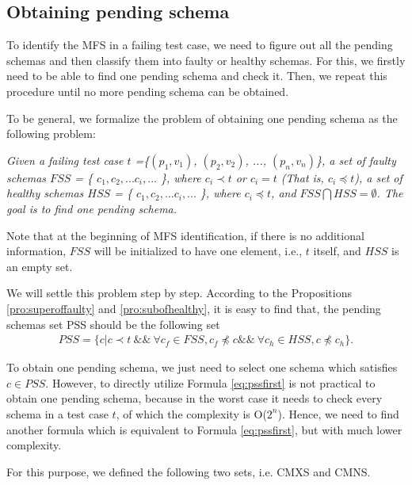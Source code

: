 \subsection{Obtaining pending schema}

To identify the MFS in a failing test case, we need to figure out all the pending schemas and then classify them into faulty or healthy schemas. For this, we firstly need to be able to find one pending schema and check it. Then, we repeat this procedure until no more pending schema can be obtained.

To be general, we formalize the problem of obtaining one pending schema as the following problem:

\emph{Given a failing test case $t$ =\{$(p_{1}, v_{1})$, $(p_{2}, v_{2})$, ..., $(p_{n}, v_{n})$\}, a set of faulty schemas $FSS$ = \{ $c_{1}, c_{2}, ... c_{i}, ...$ \}, where  $c_{i} \prec t$ or $c_{i} = t$ (That is, $c_{i} \preceq t $), a set of healthy schemas $HSS$ = \{ $c_{1}, c_{2}, ... c_{i}, ...$ \}, where  $c_{i} \preceq t$, and $FSS \bigcap HSS = \emptyset$. The goal is to find one pending schema.}

Note that at the beginning of MFS identification, if there is no additional information, $FSS$ will be initialized to have one element, i.e., $t$ itself, and $HSS$ is an empty set.

We will settle this problem step by step. According to the Propositions \ref{pro:superoffaulty} and \ref{pro:subofhealthy}, it is easy to find that, the pending schemas set PSS should be the following set
\begin{equation}
\begin{aligned}\label{eq:pssfirst}
PSS=\{ c | c \prec t\ \&\&\ \forall c_{f} \in FSS,  c_{f} \npreceq c   \&\&\  \forall c_{h} \in HSS, c \npreceq c_{h} \} .
\end{aligned}
\end{equation}

To obtain one pending schema, we just need to select one schema which satisfies $ c \in PSS$. However, to directly utilize Formula \ref{eq:pssfirst} is not practical to obtain one pending schema, because in the worst case it needs to check every schema in a test case $t$, of which the complexity is O($2^{n}$). Hence, we need to find another formula which is equivalent to Formula \ref{eq:pssfirst}, but with much lower complexity.

For this purpose, we defined the following two sets, i.e. CMXS and CMNS.

